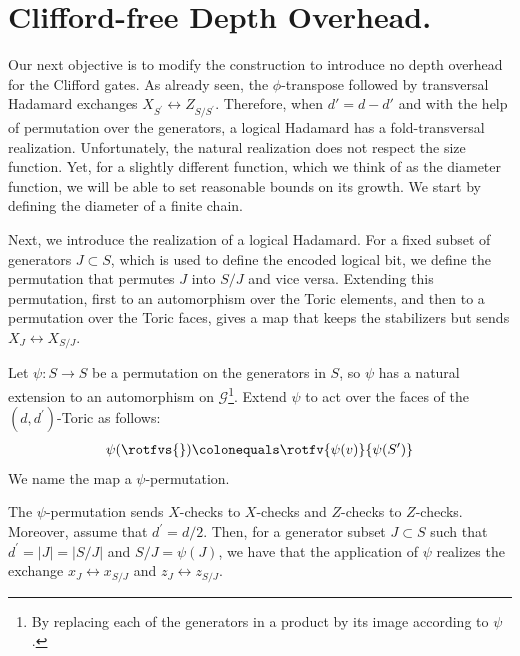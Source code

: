 

\section{Clifford-free Depth Overhead.}
\label{section:cliffordfree}
Our next objective is to modify the construction to introduce no depth overhead for the Clifford gates. As already seen, the $\phi$-transpose followed by transversal Hadamard exchanges $X_{S^{\prime}} \leftrightarrow Z_{S/S^{\prime}}$. Therefore, when $d' = d - d'$ and with the help of permutation over the generators, a logical Hadamard has a fold-transversal realization. Unfortunately, the natural realization does not respect the size function. Yet, for a slightly different function, which we think of as the diameter function, we will be able to set reasonable bounds on its growth. We start by defining the diameter of a finite chain.

\newcommand{\Sizestar}[1]{ \mathbf{Size}^{\star}( #1 )  }
Next, we introduce the realization of a logical Hadamard.
For a fixed subset of generators $ J \subset S $, which is used to define the encoded logical bit, we define the permutation that permutes $ J $ into $ S/J $ and vice versa. Extending this permutation, first to an automorphism over the Toric elements, and then to a permutation over the Toric faces, gives a map that keeps the stabilizers but sends $ X_{J} \leftrightarrow X_{S/J} $.
\begin{definition}
Let $\psi \colon S \rightarrow S$ be a permutation on the generators in $S$, so $\psi$ has a natural extension to an automorphism on $\mathcal{G}$\footnote{By replacing each of the generators in a product by its image according to $\psi$.}. Extend $\psi$ to act over the faces of the $(d,d^{\prime})$-Toric as follows:
  \begin{equation*}
    \begin{split}
      \psi( \rotfvs{}) \colonequals \rotfv{\psi(v)}{\psi(S^{\prime})}
    \end{split}
  \end{equation*}
  We name the map a $\psi$-permutation. 
\end{definition}

\begin{claim}
  The $\psi$-permutation sends $X$-checks to $X$-checks and $Z$-checks to $Z$-checks. Moreover, assume that $d^{\prime}=d/2$. Then, for a generator subset $J\subset S$ such that $d^{\prime} = |J| = |S/J|$ and $S/J = \psi(J)$, we have that the application of $\psi$ realizes the exchange $x_{J} \leftrightarrow x_{S/J}$ and $z_{J} \leftrightarrow z_{S/J}$. 
\end{claim}

